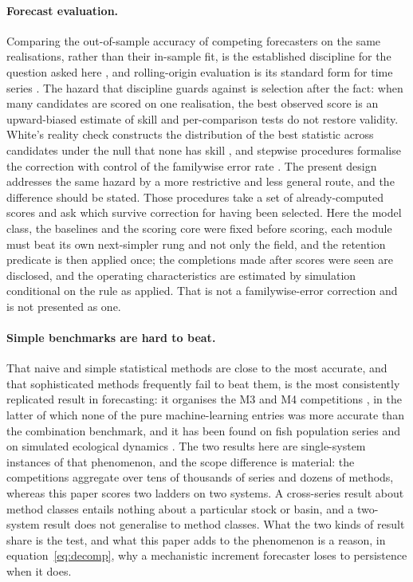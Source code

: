 \documentclass[preprint,11pt,authoryear]{elsarticle}
\theoremstyle{definition}
\theoremstyle{remark}
\begin{document}
\paragraph{Forecast evaluation.} Comparing the out-of-sample accuracy of competing forecasters on the same realisations, rather than their in-sample fit, is the established discipline for the question asked here \citep{Diebold1995,HyndmanKoehler2006,HyndmanAthanasopoulos2021}, and rolling-origin evaluation is its standard form for time series \citep{Tashman2000,Bergmeir2012}. The hazard that discipline guards against is selection after the fact: when many candidates are scored on one realisation, the best observed score is an upward-biased estimate of skill and per-comparison tests do not restore validity. White's reality check constructs the distribution of the best statistic across candidates under the null that none has skill \citep{White2000}, and stepwise procedures formalise the correction with control of the familywise error rate \citep{RomanoWolf2005}. The present design addresses the same hazard by a more restrictive and less general route, and the difference should be stated. Those procedures take a set of already-computed scores and ask which survive correction for having been selected. Here the model class, the baselines and the scoring core were fixed before scoring, each module must beat its own next-simpler rung and not only the field, and the retention predicate is then applied once; the completions made after scores were seen are disclosed, and the operating characteristics are estimated by simulation conditional on the rule as applied. That is not a familywise-error correction and is not presented as one.

\paragraph{Simple benchmarks are hard to beat.} That naive and simple statistical methods are close to the most accurate, and that sophisticated methods frequently fail to beat them, is the most consistently replicated result in forecasting: it organises the M3 and M4 competitions \citep{Makridakis2000,Makridakis2018}, in the latter of which none of the pure machine-learning entries was more accurate than the combination benchmark, and it has been found on fish population series \citep{Ward2014} and on simulated ecological dynamics \citep{Perretti2013}. The two results here are single-system instances of that phenomenon, and the scope difference is material: the competitions aggregate over tens of thousands of series and dozens of methods, whereas this paper scores two ladders on two systems. A cross-series result about method classes entails nothing about a particular stock or basin, and a two-system result does not generalise to method classes. What the two kinds of result share is the test, and what this paper adds to the phenomenon is a reason, in equation~\eqref{eq:decomp}, why a mechanistic increment forecaster loses to persistence when it does.
\end{document}
